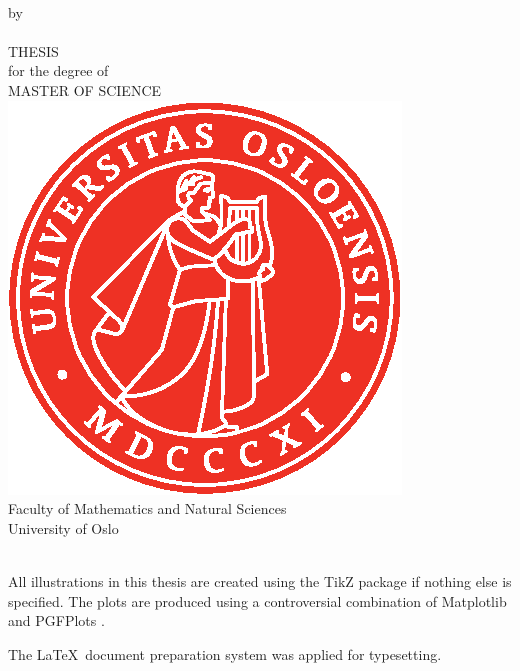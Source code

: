 \thispagestyle{empty}
\begin{center} \vspace{1cm}
    \textbf{\Large{\mtitle}}\\ \vspace{0.5cm}
    \small{by}\\ \vspace{0.5cm}
    \large{\mauthor}\\ \vspace{4.4cm}
    \large{THESIS}\\ \vspace{0.3cm}
    \small{for the degree of}\\ \vspace{0.3cm}
    \large{MASTER OF SCIENCE}\\ \vspace{0.7cm}
    \includegraphics[scale=1.0]{../Images/UiO_Segl_pms485.eps} \\ \vspace{0.5cm}
    \large{Faculty of Mathematics and Natural Sciences \\ University of Oslo} \\ \vspace{0.5cm}
    \small{\mdate}\\ \vfill
\end{center}
\newpage
\vspace*{\fill}
{\setlength{\parindent}{0cm}
All illustrations in this thesis are created using the TikZ package \cite{tantau_graph_2013} if nothing else is specified. The plots are produced using a controversial combination of Matplotlib \cite{hunter_matplotlib:_2007} and PGFPlots \cite{tantau_graph_2013}.\bigskip

The \LaTeX\, document preparation system was applied for typesetting.}
 
